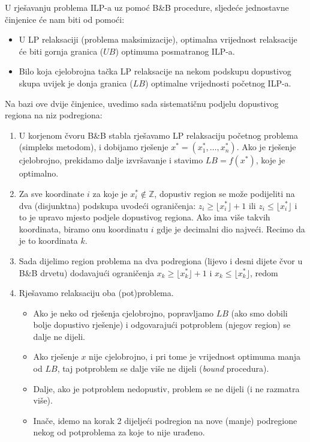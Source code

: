 \documentclass[a4paper, utf8, 11pt, colorlinks]{book}
\begin{document}
U rješavanju problema  ILP-a uz pomoć B\&B procedure, sljedeće jednostavne činjenice će nam biti od pomoći:
\begin{itemize}
    \item  U LP relaksaciji (problema 
           maksimizacije), optimalna vrijednost  relaksacije  će biti gornja granica ($UB$) optimuma posmatranog ILP-a. 
    \item  Bilo koja cjelobrojna tačka LP relaksacije na nekom podskupu  
           dopustivog skupa uvijek je  donja granica ($LB$) optimalne vrijednosti početnog ILP-a. 
\end{itemize}
Na bazi ove dvije činjenice, uvedimo sada sistematičnu podjelu dopustivog regiona na niz podregiona:
\begin{enumerate}
    \item U korjenom čvoru B\&B stabla rješavamo LP relaksaciju početnog problema     (simpleks metodom), i dobijamo rješenje $x^*=(x^*_1, \ldots, x^*_n)$.   Ako je rješenje cjelobrojno, prekidamo dalje izvršavanje i stavimo $LB=f(x^*)$, koje je optimalno. %
    \item Za sve koordinate $i$ za koje je $x^*_i \not \in \mathbb{Z}$, dopustiv region se može podijeliti na dva (disjunktna) podskupa uvodeći ograničenja: $z_i \geq \lfloor x^*_i \rfloor + 1$ ili $z_i \leq \lfloor x^*_i \rfloor$ i to je upravo mjesto podjele dopustivog regiona. Ako ima više takvih koordinata, biramo onu koordinatu $i$ gdje je decimalni dio najveći.  Recimo da je to koordinata $k$.
    \item Sada dijelimo region problema na dva podregiona (lijevo i desni dijete čvor u B\&B drvetu) dodavajući 
          ograničenja $x_k \geq \lfloor x^*_k \rfloor + 1$ i $x_k \leq \lfloor x^*_k \rfloor$, redom
    \item Rješavamo relaksaciju oba (pot)problema. 
    \begin{itemize}
    	\item  Ako je neko od rješenja cjelobrojno, popravljamo $LB$ (ako smo dobili bolje dopustivo rješenje) i odgovarajući potproblem (njegov region) se dalje ne dijeli. 
    	\item Ako rješenje $x$ nije cjelobrojno, i pri tome je vrijednost optimuma manja od $LB$, taj potproblem se dalje više ne dijeli (\emph{bound} procedura). 
    	\item Dalje, ako je potproblem nedopustiv, problem se ne dijeli (i ne razmatra više). 
    	\item Inače, idemo na korak 2 dijeljeći podregion   na nove (manje) podregione nekog od potproblema za koje to nije urađeno.    
    \end{itemize}

\end{enumerate}
\end{document}
